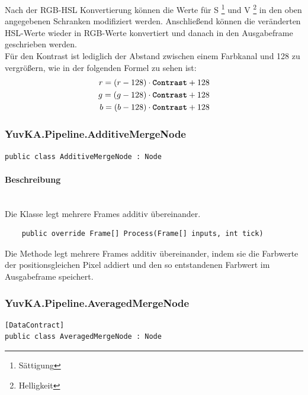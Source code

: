 \begin{itemize}
	Nach der RGB-HSL Konvertierung können die Werte für S \footnote{Sättigung} und V \footnote{Helligkeit} in den oben angegebenen Schranken modifiziert werden. Anschließend können die veränderten HSL-Werte wieder in RGB-Werte konvertiert und danach in den Ausgabeframe geschrieben werden. \\
	Für den Kontrast ist lediglich der Abstand zwischen einem Farbkanal und 128 zu vergrößern, wie in der folgenden Formel zu sehen ist: \begin{eqnarray*}
   r = (r - 128) \cdot \text{\textbf{\texttt{Contrast}}} + 128 \\
	g = (g - 128) \cdot \text{\textbf{\texttt{Contrast}}} + 128 \\
	b = (b - 128) \cdot \text{\textbf{\texttt{Contrast}}} + 128
\end{eqnarray*}

\end{itemize}

\subsubsection{YuvKA.Pipeline.AdditiveMergeNode}

\begin{verbatim}
public class AdditiveMergeNode : Node
\end{verbatim}

\paragraph{Beschreibung}~\\
Die Klasse  legt mehrere Frames additiv übereinander.

\begin{itemize}

\begin{verbatim}
	public override Frame[] Process(Frame[] inputs, int tick)
\end{verbatim}
Die Methode  legt mehrere Frames additiv übereinander, indem sie die Farbwerte der positionsgleichen Pixel addiert und den so entstandenen Farbwert im Ausgabeframe speichert.
\end{itemize}

\subsubsection{YuvKA.Pipeline.AveragedMergeNode}

\begin{verbatim}
[DataContract]
public class AveragedMergeNode : Node
\end{verbatim}

